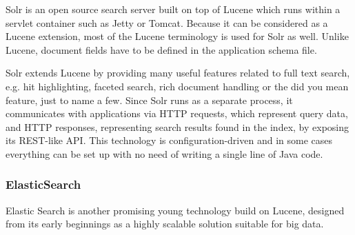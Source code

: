Solr \cite{SolrHome} is an open source search server built on top of Lucene which runs within a servlet container such as Jetty or Tomcat.
Because it can be considered as a Lucene extension, most of the Lucene terminology is used for Solr as well. 
Unlike Lucene, document fields have to be defined in the application schema file.

Solr extends Lucene by providing many useful features related to full text search, e.g. hit highlighting,
faceted search, rich document handling or the did you mean feature, just to name a few. 
Since Solr runs as a separate process, it communicates with applications via HTTP requests, which represent query data, and HTTP responses, representing search results found in the index, by exposing its REST-like API. 
This technology is configuration-driven and in some cases everything can be set up with no need of writing a single line of Java code. 

\subsubsection{ElasticSearch}

Elastic Search \cite{ElasticSearchHome} is another promising young technology build on Lucene, designed from its early beginnings as a highly scalable solution suitable for big data.
